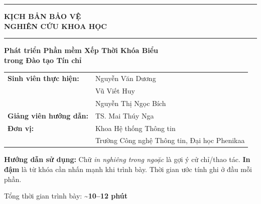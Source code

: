 \documentclass[12pt, a4paper]{article}
\begin{document}
\begin{titlepage}
  \centering
  \vspace*{2cm}

  {\color{NavyBlue}\rule{\linewidth}{2pt}}
  \vspace{0.5cm}

  {\Huge\bfseries\color{NavyBlue} KỊCH BẢN BẢO VỆ\\[0.4em] NGHIÊN CỨU KHOA HỌC}

  \vspace{0.5cm}
  {\color{NavyBlue}\rule{\linewidth}{2pt}}

  \vspace{1.5cm}

  {\LARGE\bfseries Phát triển Phần mềm Xếp Thời Khóa Biểu\\[0.3em] trong Đào tạo Tín chỉ}

  \vspace{2cm}

  \begin{tabular}{ll}
    \textbf{Sinh viên thực hiện:} & Nguyễn Văn Dương \\[0.3em]
                                  & Vũ Viết Huy \\[0.3em]
                                  & Nguyễn Thị Ngọc Bích \\[0.8em]
    \textbf{Giảng viên hướng dẫn:} & TS. Mai Thúy Nga \\[0.8em]
    \textbf{Đơn vị:} & Khoa Hệ thống Thông tin \\[0.3em]
                     & Trường Công nghệ Thông tin, Đại học Phenikaa \\
  \end{tabular}

  \vspace{2.5cm}

  \begin{notebox}
    \centering
    \textbf{Hướng dẫn sử dụng:} Chữ \textit{in nghiêng trong ngoặc} là gợi ý cử chỉ/thao tác. \textbf{In đậm} là từ khóa cần nhấn mạnh khi trình bày. Thời gian ước tính ghi ở đầu mỗi phần.
  \end{notebox}

  \vfill
  {\large\color{MidGray} Tổng thời gian trình bày: \textbf{\textasciitilde{}10--12 phút}}

\end{titlepage}

\tableofcontents
\newpage
\end{document}
